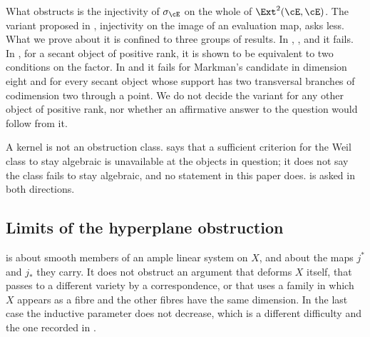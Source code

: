\begin{remark}\label{rem:weakerscope}
What \cite[Corollary~9.18]{paperI} obstructs is the injectivity of $\sigma_{\cE}$ on the
whole of $\Ext^{2}(\cE,\cE)$. The variant proposed in
\cite[Question 11.4]{Mar25b}, injectivity on the image of an evaluation map,
asks less. What we prove about it is confined to three groups of results.
In \cite[Theorem~9.19]{paperI}, \cite[Proposition~4.18]{paperII}, \cite[Theorem~9.20]{paperI} and
\cite[Corollary~4.21]{paperII} it fails. In \cite[Theorem~4.56]{paperII}, for a secant object of
positive rank, it is shown to be equivalent to two conditions on the factor.
In \cite[Theorem~4.61]{paperII} and \cite[Corollary~4.63]{paperII} it fails for
Markman's candidate in dimension eight and for every secant object whose
support has two transversal branches of codimension two through a point. We
do not decide the variant for any other object of positive rank, nor whether
an affirmative answer to the question would follow from it.
\end{remark}

\begin{remark}\label{rem:notnondeform}
A kernel is not an obstruction class. \cite[Corollary~9.18]{paperI} says that a sufficient
criterion for the Weil class to stay algebraic is unavailable at the objects
in question; it does not say the class fails to stay algebraic, and no
statement in this paper does. \cite[Question~15.13]{paperI} is asked in both
directions.
\end{remark}

\subsection{Limits of the hyperplane obstruction}

\begin{remark}%
\label{rem:notlinear}
\cite[Theorem~10.3]{paperI} is about smooth members of an ample linear system on
$X$, and about the maps $j^{*}$ and $j_{*}$ they carry. It does not obstruct
an argument that deforms $X$ itself, that passes to a different variety by a
correspondence, or that uses a family in which $X$ appears as a fibre and the
other fibres have the same dimension. In the last case the inductive parameter
does not decrease, which is a different difficulty and the one recorded in
\cite[Remark~10.10]{paperI}.
\end{remark}

